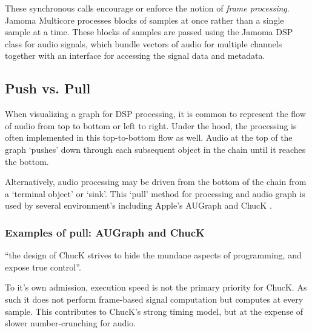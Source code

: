 \documentclass[twoside,a4paper]{article}
\begin{document}
These synchronous calls encourage or enforce the notion of \emph{frame processing}.  Jamoma Multicore processes blocks of samples at once rather than a single sample at a time.  These blocks of samples are passed using the Jamoma DSP class for audio signals, which bundle vectors of audio for multiple channels together with an interface for accessing the signal data and metadata.




\subsection{Push vs. Pull} %

When visualizing a graph for DSP processing, it is common to represent the flow of audio from top to bottom or left to right.  Under the hood, the processing is often implemented in this top-to-bottom flow as well.  Audio at the top of the graph `pushes' down through each subsequent object in the chain until it reaches the bottom.

Alternatively, audio processing may be driven from the bottom of the chain from a `terminal object' or `sink'.  This `pull' method for processing and audio graph is used by several environment's including Apple's AUGraph and ChucK \cite{wang:2008}.


% 


\subsubsection{Examples of pull: AUGraph and ChucK}


``the design of ChucK strives to hide the mundane aspects of programming, and expose true control''\cite{wang:2008}.

To it's own admission, execution speed is not the primary priority for ChucK.  As such it does not perform frame-based signal computation but computes at every sample.  This contributes to ChucK's strong timing model, but at the expense of slower number-crunching for audio.
\end{document}

